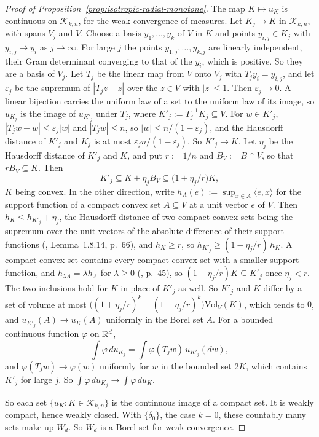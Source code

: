 \begin{proof}[Proof of Proposition~\ref{prop:isotropic-radial-monotone}]
The map $K \mapsto u_K$ is continuous on $\mathcal{K}_{k,n}$, for the weak convergence of measures.
Let $K_j \to K$ in $\mathcal{K}_{k,n}$, with spans $V_j$ and $V$. Choose a basis $y_1,\dots,y_k$ of
$V$ in $K$ and points $y_{i,j} \in K_j$ with $y_{i,j} \to y_i$ as $j \to \infty$. For large $j$
the points $y_{1,j},\dots,y_{k,j}$ are linearly independent, their Gram determinant converging to
that of the $y_i$, which is positive. So they are a basis of $V_j$. Let $T_j$ be the linear map
from $V$ onto $V_j$ with $T_jy_i = y_{i,j}$, and let $\varepsilon_j$ be the supremum of $|T_jz - z|$
over the $z \in V$ with $|z| \le 1$. Then $\varepsilon_j \to 0$. A linear bijection carries the
uniform law of a set to the uniform law of its image, so $u_{K_j}$ is the image of $u_{K'_j}$ under
$T_j$, where $K'_j := T_j^{-1}K_j \subseteq V$. For $w \in K'_j$, $|T_jw - w| \le \varepsilon_j|w|$
and $|T_jw| \le n$, so $|w| \le n/(1-\varepsilon_j)$, and the Hausdorff distance of $K'_j$ and $K_j$
is at most $\varepsilon_jn/(1-\varepsilon_j)$. So $K'_j \to K$. Let $\eta_j$ be the Hausdorff
distance of $K'_j$ and $K$, and put $r := 1/n$ and $B_V := \bar B \cap V$, so that
$rB_V \subseteq K$. Then
\[
  K'_j \subseteq K + \eta_jB_V \subseteq \bigl(1 + \eta_j/r\bigr)K ,
\]
$K$ being convex. In the other direction, write $h_A(e) := \sup_{x \in A}\langle e,x\rangle$ for the
support function of a compact convex set $A \subseteq V$ at a unit vector $e$ of $V$. Then
$h_K \le h_{K'_j} + \eta_j$, the Hausdorff distance of two compact convex sets being the supremum
over the unit vectors of the absolute difference of their support functions
(, Lemma~1.8.14, p.~66), and $h_K \ge r$, so
$h_{K'_j} \ge (1 - \eta_j/r)\,h_K$. A compact
convex set contains every compact convex set with a smaller support function, and
$h_{\lambda A} = \lambda h_A$ for $\lambda \ge 0$ (, p.~45), so
$(1 - \eta_j/r)K \subseteq K'_j$ once $\eta_j < r$. The two inclusions hold for $K$ in place of
$K'_j$ as well. So $K'_j$ and $K$ differ by a set of volume at most
$\bigl((1+\eta_j/r)^k - (1-\eta_j/r)^k\bigr)\mathrm{Vol}_V(K)$, which tends to $0$, and
$u_{K'_j}(A) \to u_K(A)$ uniformly in the Borel set $A$. For a bounded continuous function
$\varphi$ on $\mathbb{R}^d$,
\[
  \int\varphi\,du_{K_j} = \int\varphi(T_jw)\,u_{K'_j}(dw) ,
\]
and $\varphi(T_jw) \to \varphi(w)$ uniformly for $w$ in the bounded set $2K$, which contains $K'_j$
for large $j$. So $\int\varphi\,du_{K_j} \to \int\varphi\,du_K$.

So each set $\{u_K : K \in \mathcal{K}_{k,n}\}$ is the continuous image of a compact set. It is
weakly compact, hence weakly closed. With $\{\delta_0\}$, the case $k = 0$, these countably many
sets make up $W_d$. So $W_d$ is a Borel set for weak convergence.
\end{proof}

